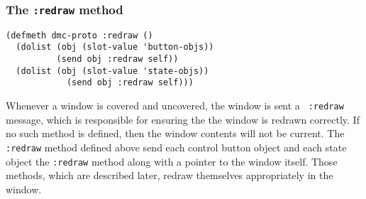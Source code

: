 \subsubsection{The {\tt :redraw} method}
\label{subsubsec:dmc-redraw}
\begin{verbatim}
(defmeth dmc-proto :redraw ()
  (dolist (obj (slot-value 'button-objs))
          (send obj :redraw self))
  (dolist (obj (slot-value 'state-objs))
            (send obj :redraw self)))
\end{verbatim}
Whenever a window is covered and uncovered, the window is sent a {\tt
  :redraw} message, which is responsible for ensuring the the window
is redrawn correctly.  If no such method is defined, then the window
contents will not be current.  The {\tt :redraw} method defined above
send each control button object and each state object
the {\tt :redraw} method along with a pointer to the window
itself.  Those methods, which are described later, redraw themselves
appropriately in the window. 

